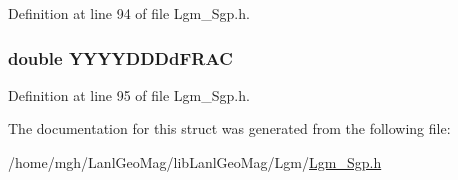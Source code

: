 Definition at line 94 of file Lgm\_\-Sgp.h.\hypertarget{struct___sgp_t_l_e_f6a8f0b6159c1b5df5c8f6334b4002db}{
\subsubsection[{YYYYDDDdFRAC}]{\setlength{\rightskip}{0pt plus 5cm}double {\bf YYYYDDDdFRAC}}}
\label{struct___sgp_t_l_e_f6a8f0b6159c1b5df5c8f6334b4002db}




Definition at line 95 of file Lgm\_\-Sgp.h.

The documentation for this struct was generated from the following file:\begin{CompactItemize}
\item 
/home/mgh/LanlGeoMag/libLanlGeoMag/Lgm/\hyperlink{_lgm___sgp_8h}{Lgm\_\-Sgp.h}\end{CompactItemize}

